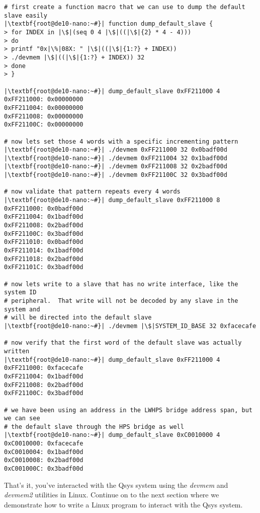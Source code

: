 \begin{flushleft}
\begin{enumerate}[
	label=\textbf{Step \arabic*.},
	leftmargin=*,
	widest={00},
	align=left]
\begin{enumerate}[
	label=\textbf{Step \arabic{enumi}\alph*.},
	leftmargin=*,
	align=left]
\begin{verbatim}
# first create a function macro that we can use to dump the default slave easily
|\textbf{root@de10-nano:~#}| function dump_default_slave {
> for INDEX in |\$|(seq 0 4 |\$|((|\$|{2} * 4 - 4)))
> do
> printf "0x|\%|08X: " |\$|((|\$|{1:?} + INDEX))
> ./devmem |\$|((|\$|{1:?} + INDEX)) 32
> done
> }

|\textbf{root@de10-nano:~#}| dump_default_slave 0xFF211000 4
0xFF211000: 0x00000000
0xFF211004: 0x00000000
0xFF211008: 0x00000000
0xFF21100C: 0x00000000

# now lets set those 4 words with a specific incrementing pattern
|\textbf{root@de10-nano:~#}| ./devmem 0xFF211000 32 0x0badf00d
|\textbf{root@de10-nano:~#}| ./devmem 0xFF211004 32 0x1badf00d
|\textbf{root@de10-nano:~#}| ./devmem 0xFF211008 32 0x2badf00d
|\textbf{root@de10-nano:~#}| ./devmem 0xFF21100C 32 0x3badf00d

# now validate that pattern repeats every 4 words
|\textbf{root@de10-nano:~#}| dump_default_slave 0xFF211000 8
0xFF211000: 0x0badf00d
0xFF211004: 0x1badf00d
0xFF211008: 0x2badf00d
0xFF21100C: 0x3badf00d
0xFF211010: 0x0badf00d
0xFF211014: 0x1badf00d
0xFF211018: 0x2badf00d
0xFF21101C: 0x3badf00d

# now lets write to a slave that has no write interface, like the system ID
# peripheral.  That write will not be decoded by any slave in the system and
# will be directed into the default slave
|\textbf{root@de10-nano:~#}| ./devmem |\$|SYSTEM_ID_BASE 32 0xfacecafe

# now verify that the first word of the default slave was actually written
|\textbf{root@de10-nano:~#}| dump_default_slave 0xFF211000 4
0xFF211000: 0xfacecafe
0xFF211004: 0x1badf00d
0xFF211008: 0x2badf00d
0xFF21100C: 0x3badf00d

# we have been using an address in the LWHPS bridge address span, but we can see
# the default slave through the HPS bridge as well
|\textbf{root@de10-nano:~#}| dump_default_slave 0xC0010000 4
0xC0010000: 0xfacecafe
0xC0010004: 0x1badf00d
0xC0010008: 0x2badf00d
0xC001000C: 0x3badf00d

\end{verbatim}

\end{enumerate}

\end{enumerate}

That's it, you've interacted with the Qsys system using the \emph{devmem} and \emph{devmem2} utilities in Linux.  Continue on to the next section where we demonstrate how to write a Linux program to interact with the Qsys system.

\end{flushleft}

